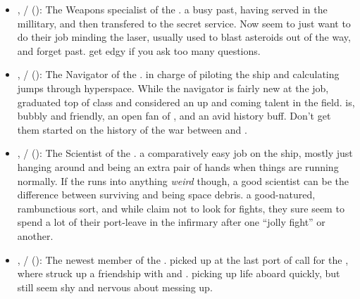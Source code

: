 \documentclass[sheet]{TMFHope}
\begin{document}
\begin{itemize}
  \item \cWeap{\full}, \cWeap{\they}/\cWeap{\them} (\cWeap{\MYplayer}): The Weapons specialist of the \pNew{}. \cWeap{\Theyhave} a busy past, having served in the millitary, and then transfered to the secret service. Now \cWeap{\they} seem\cWeap{\plural} to just want to do their job minding the \pNew{} laser, usually used to blast asteroids out of the way, and forget \cWeap{\their} past. \cWeap{} get\cWeap{\plural} edgy if you ask too many questions.
  
  \item \cNav{\full}, \cNav{\they}/\cNav{\them} (\cNav{\MYplayer}): The Navigator of the \pNew{}. \cNav{\Theyare} in charge of piloting the ship and calculating jumps through hyperspace. While the \pNew{} navigator is fairly new at the job, \cNav{\they} graduated top of \cNav{\their} class and  considered an up and coming talent in the field. \cNav{} is, bubbly and friendly, an open fan\cNav{\kid} of \cCap{}, and an avid history buff. Don't get them started on the history of the war between \pPlan{} and \pEdge{}.
  
  \item \cSci{\full}, \cSci{\they}/\cSci{\them} (\cSci{\MYplayer}): The Scientist of the \pNew{}. \cSci{\Theyhave} a comparatively easy job on the ship, mostly just hanging around and being an extra pair of hands when things are running normally. If the \pNew{} runs into anything \emph{weird} though, a good scientist can be the difference between surviving and being space debris. \cSci{\Theyare} a good-natured, rambunctious sort, and while \cSci{\they} claim not to look for fights, they sure seem to spend a lot of their port-leave in the infirmary after one ``jolly fight'' or another.
  
  \item \cBoy{\full}, \cBoy{\they}/\cBoy{\them} (\cBoy{\MYplayer}): The newest member of the \pNew{}. \cBoy{\Theywere} picked up at the last port of call for the \pNew{}, where \cBoy{\they} struck up a friendship with \cEng{} and \cNav{}. \cBoy{\Theyare} picking up life aboard \pNew{} quickly, but still seem shy and nervous about messing up.
\end{itemize}
\end{document}
